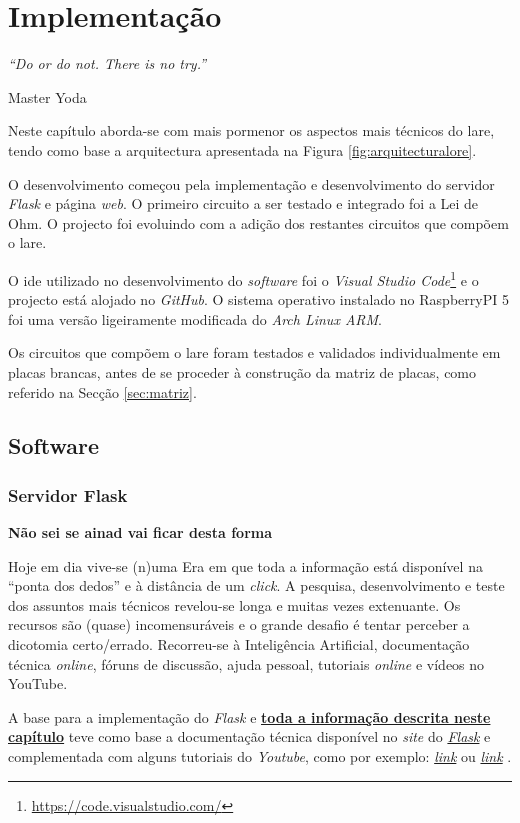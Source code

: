 \label{Capítulo4}
\chapter{Implementação}
\begin{center}
	\textit{``Do or do not. There is no try.''}

	Master Yoda
\end{center}
Neste capítulo aborda-se com mais pormenor os aspectos mais técnicos do \acrshort{lare}, tendo como base a arquitectura apresentada na Figura \ref{fig:arquitecturalore}.

O desenvolvimento começou pela implementação e desenvolvimento do servidor \textit{Flask} e página \textit{web}. O primeiro circuito a ser testado e integrado foi a Lei de Ohm. O projecto foi evoluindo com a adição dos restantes circuitos que compõem o \acrshort{lare}.

O \acrshort{ide} utilizado no desenvolvimento do \textit{software} foi o \textit{Visual Studio Code}\footnote{\url{https://code.visualstudio.com/}} e o projecto está alojado no \textit{GitHub}. O sistema operativo instalado no RaspberryPI 5 foi uma versão ligeiramente modificada do \textit{Arch Linux ARM}.

Os circuitos que compõem o \acrshort{lare} foram testados e validados individualmente em placas brancas, antes de se proceder à construção da matriz de placas, como referido na Secção \ref{sec:matriz}.

\section{Software}
\subsection{Servidor Flask}
\label{sec:flask}
\textbf{Não sei se ainad vai ficar desta forma}

Hoje em dia vive-se (n)uma Era em que toda a informação está disponível na ``ponta dos dedos'' e à distância de um \textit{click}. A pesquisa, desenvolvimento e teste dos assuntos mais técnicos revelou-se longa e muitas vezes extenuante. Os recursos são (quase) incomensuráveis e o grande desafio é tentar perceber a dicotomia certo/errado. Recorreu-se à Inteligência Artificial, documentação técnica \textit{online}, fóruns de discussão, ajuda pessoal, tutoriais \textit{online} e vídeos no YouTube.

A base para a implementação do \textit{Flask} e \underline{\textbf{toda a informação descrita neste}} \underline{\textbf{capítulo}} teve como base a documentação técnica disponível no \textit{site} do \href{https://flask.palletsprojects.com/en/3.0.x/}{\textit{Flask}} e complementada com alguns tutoriais do \textit{Youtube}, como por exemplo: \href{https://www.youtube.com/watch?v=dam0GPOAvVI}{\textit{link}} ou \href{https://www.youtube.com/watch?v=bB6Yyh7nUl4}{\textit{link}} .

